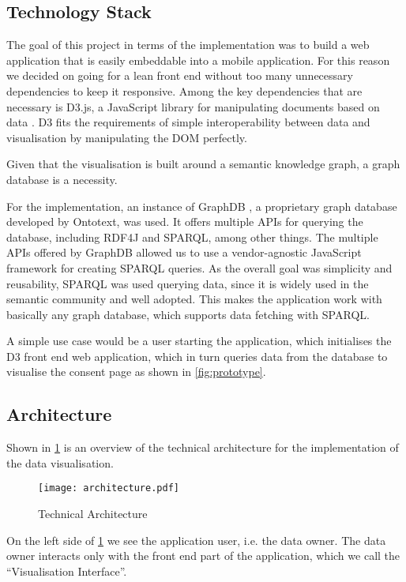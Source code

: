 \documentclass[../paper.tex]{subfiles}
\begin{document}
  \subsection{Technology Stack}

  The goal of this project in terms of the implementation was to
  build a web application that is easily embeddable into a mobile application.
  For this reason we decided on going for a lean front end without too many
  unnecessary dependencies to keep it responsive. Among the key dependencies that
  are necessary is D3.js, a JavaScript library for manipulating documents based
  on data \cite{d3}. D3 fits the requirements of simple interoperability between
  data and visualisation by manipulating the DOM perfectly.

  Given that the
  visualisation is built around a semantic knowledge graph, a graph database is
  a necessity.

  For the implementation, an instance of  GraphDB \cite{graphdb}, a proprietary graph
  database developed by Ontotext, was used. It offers multiple APIs for querying the database,
  including RDF4J and SPARQL, among other things. The multiple APIs offered by
  GraphDB allowed us to use a vendor-agnostic JavaScript framework for
  creating SPARQL queries. As the overall goal was simplicity and reusability,
  SPARQL was used querying data, since it is widely used
  in the semantic community and well adopted. This makes the application work with
  basically any graph database, which supports data fetching with SPARQL.

  A simple use case would be a user starting the application, which initialises
  the D3 front end web application, which in turn queries data from the database
  to visualise the consent page as shown in \cref{fig:prototype}.

  \subsection{Architecture}

  Shown in \cref{fig:architecture} is an overview of the technical architecture
  for the implementation of the data visualisation.

  \begin{figure}
    \centering
    \texttt{[image: architecture.pdf]}
    \caption{Technical Architecture}
    \label{fig:architecture}
  \end{figure}

  On the left side of \cref{fig:architecture} we see the application user, i.e.
  the data owner. The data owner interacts only with the front end part of the
  application, which we call the “Visualisation Interface”.
\end{document}
